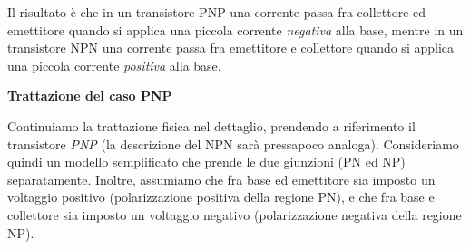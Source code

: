 \documentclass[a4paper,11pt]{article}
\begin{document}
Il risultato è che in un transistore PNP una corrente passa fra collettore ed emettitore quando si applica una piccola corrente \textit{negativa} alla base, mentre in un transistore NPN una corrente passa fra emettitore e collettore quando si applica una piccola corrente \textit{positiva} alla base.

\par\smallskip

\noindent
\textbf{\textsf{Trattazione del caso PNP}}

\noindent
Continuiamo la trattazione fisica nel dettaglio, prendendo a riferimento il transistore \textit{PNP} (la descrizione del NPN sarà pressapoco analoga). Consideriamo quindi un modello semplificato che prende le due giunzioni (PN ed NP) separatamente. Inoltre, assumiamo che fra base ed emettitore sia imposto un voltaggio positivo (polarizzazione positiva della regione PN), e che fra base e collettore sia imposto un voltaggio negativo (polarizzazione negativa della regione NP).
\end{document}
